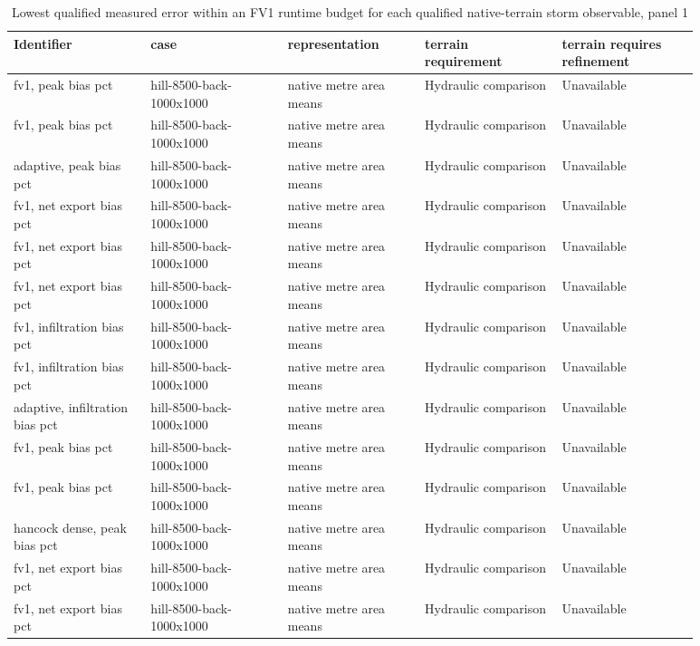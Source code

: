 \begingroup
\small
\setlength{\tabcolsep}{2pt}
\begin{longtable}{p{0.1760\linewidth}p{0.1760\linewidth}p{0.1760\linewidth}p{0.1760\linewidth}p{0.1760\linewidth}}
\caption{Lowest qualified measured error within an FV1 runtime budget for each qualified native-terrain storm observable, panel 1}\\
\hline
Identifier & case & representation & terrain requirement & terrain requires refinement \\
\hline\endhead
fv1, peak bias pct & hill-8500-back-1000x1000 & native metre area means & Hydraulic comparison & Unavailable \\
fv1, peak bias pct & hill-8500-back-1000x1000 & native metre area means & Hydraulic comparison & Unavailable \\
adaptive, peak bias pct & hill-8500-back-1000x1000 & native metre area means & Hydraulic comparison & Unavailable \\
fv1, net export bias pct & hill-8500-back-1000x1000 & native metre area means & Hydraulic comparison & Unavailable \\
fv1, net export bias pct & hill-8500-back-1000x1000 & native metre area means & Hydraulic comparison & Unavailable \\
fv1, net export bias pct & hill-8500-back-1000x1000 & native metre area means & Hydraulic comparison & Unavailable \\
fv1, infiltration bias pct & hill-8500-back-1000x1000 & native metre area means & Hydraulic comparison & Unavailable \\
fv1, infiltration bias pct & hill-8500-back-1000x1000 & native metre area means & Hydraulic comparison & Unavailable \\
adaptive, infiltration bias pct & hill-8500-back-1000x1000 & native metre area means & Hydraulic comparison & Unavailable \\
fv1, peak bias pct & hill-8500-back-1000x1000 & native metre area means & Hydraulic comparison & Unavailable \\
fv1, peak bias pct & hill-8500-back-1000x1000 & native metre area means & Hydraulic comparison & Unavailable \\
hancock dense, peak bias pct & hill-8500-back-1000x1000 & native metre area means & Hydraulic comparison & Unavailable \\
fv1, net export bias pct & hill-8500-back-1000x1000 & native metre area means & Hydraulic comparison & Unavailable \\
fv1, net export bias pct & hill-8500-back-1000x1000 & native metre area means & Hydraulic comparison & Unavailable \\

\end{longtable}
